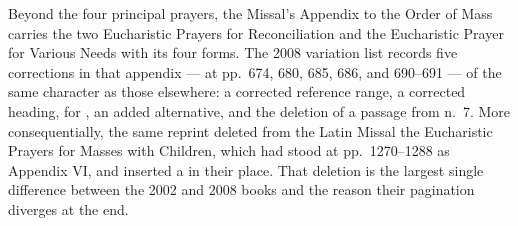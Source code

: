 Beyond the four principal prayers, the Missal's Appendix to the Order of Mass carries the two
Eucharistic Prayers for Reconciliation and the Eucharistic Prayer for Various Needs with its
four forms. The 2008 variation list records five corrections in that appendix --- at pp.\ 674,
680, 685, 686, and 690--691 --- of the same character as those elsewhere: a corrected reference
range, a corrected heading,  for , an added
alternative, and the deletion of a passage from n.\ 7. More
consequentially, the same reprint deleted from the Latin Missal the Eucharistic Prayers for
Masses with Children, which had stood at pp.\ 1270--1288 as Appendix VI, and inserted a
 in their place. That deletion is the largest single difference between
the 2002 and 2008 books and the reason their pagination diverges at the end.
